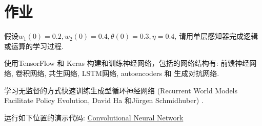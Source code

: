 \section{作业}
\begin{think}
    假设$w_1 (0)=0.2, w_2 (0)=0.4, \theta (0)=0.3, \eta=0.4$, 请用单层感知器完成逻辑或运算的学习过程.
\end{think}
\begin{think}
使用TensorFlow 和 Keras 构建和训练神经网络，包括的网络结构有: 前馈神经网络, 卷积网络, 共生网络, LSTM网络, autoencoders 和 生成对抗网络.
\end{think}
\begin{think}
    学习无监督的方式快速训练生成型循环神经网络 (Recurrent World Models Facilitate Policy Evolution, David Ha 和Jürgen Schmidhuber) \cite{ha2018worldmodels}.
\end{think}
\begin{think}
    运行如下位置的演示代码: \href{https://colab.research.google.com/drive/16a3G7Hh8Pv1X1PhZAUBEnZEkXThzDeHJ#scrollTo=D_a2USyd4giE}{Convolutional Neural Network}
\end{think}
